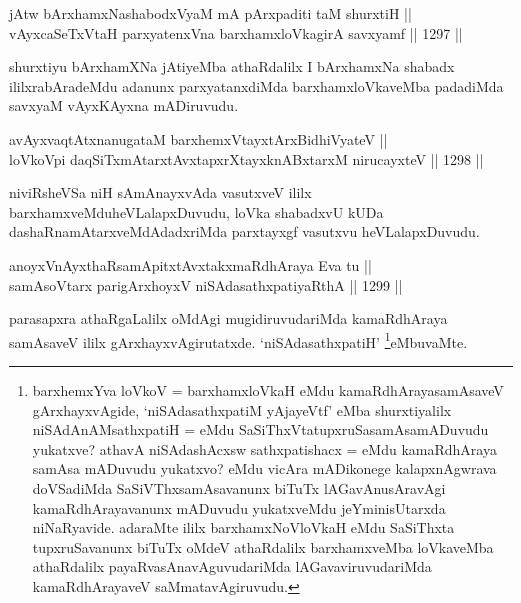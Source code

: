 
\begin{shl}
jAtw bArxhamxNashabodxV\s yaM mA pArxpaditi taM shurxtiH || \\
vAyxcaSeTxV\s taH parxyatenxVna barxhamxloVkagirA savxyamf \hfill || 1297 ||  
\end{shl}

\begin{artha}
shurxtiyu bArxhamXNa jAtiyeMba athaRdalilx I bArxhamxNa shabadx ililxrabAradeMdu adanunx parxyatanxdiMda barxhamxloVkaveMba padadiMda savxyaM vAyxKAyxna mADiruvudu.
\end{artha}


\begin{shl}
avAyxvaqtAtxnanugataM barxhemxVtayxtArxBidhiVyateV || \\
loVkoV\s pi daqSiTxmAtarxtAvxtapxrXtayxknABxtarxM nirucayxteV \hfill || 1298 ||  
\end{shl}

\begin{artha}
niviRsheVSa niH sAmAnayxvAda vasutxveV ililx barxhamxveMduheVLalapxDuvudu, loVka shabadxvU kUDa dashaRnamAtarxveMdAdadxriMda parxtayxgf vasutxvu heVLalapxDuvudu.
\end{artha}


\begin{shl}
anoyxVnAyxthaRsamApitxtAvxtakxmaRdhAraya Eva tu || \\
samAsoV\s tarx parigArxhoyxV niSAdasathxpatiyaRthA \hfill || 1299 ||  
\end{shl}

\begin{artha}
parasapxra athaRgaLalilx oMdAgi mugidiruvudariMda kamaRdhAraya samAsaveV ililx gArxhayxvAgirutatxde. `niSAdasathxpatiH' \footnote{barxhemxYva loVkoV = barxhamxloVkaH eMdu kamaRdhArayasamAsaveV gArxhayxvAgide, `niSAdasathxpatiM yAjayeVtf' eMba shurxtiyalilx niSAdAnAMsathxpatiH = eMdu SaSiThxVtatupxruSasamAsamADuvudu yukatxve? athavA niSAdashAcxsw sathxpatishacx = eMdu kamaRdhAraya samAsa mADuvudu yukatxvo? eMdu vicAra mADikonege kalapxnAgwrava doVSadiMda SaSiVThxsamAsavanunx biTuTx lAGavAnusAravAgi kamaRdhArayavanunx mADuvudu yukatxveMdu jeYminisUtarxda niNaRyavide. adaraMte ililx barxhamxNoVloVkaH eMdu SaSiThxta tupxruSavanunx biTuTx oMdeV athaRdalilx barxhamxveMba loVkaveMba athaRdalilx payaRvasAnavAguvudariMda lAGavaviruvudariMda kamaRdhArayaveV saMmatavAgiruvudu.}eMbuvaMte.
\end{artha}

